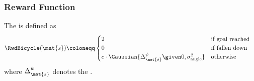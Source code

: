 \begin{frame}[label=solution_reward]
    \frametitle{Reward Function}

    \begin{definition}
        The  is defined as
        \begin{align}
            \RwdBicycle(\mat{s}) &\coloneqq \begin{cases}
                    2 & \text{if goal reached} \\
                    0 & \text{if fallen down} \\
                    c\cdot\Gaussian{\Delta^\psi_{\mat{s}} \given 0, \sigma_{\text{angle}}^2} & \text{otherwise}
                \end{cases}
        \end{align}
    where $\Delta^\psi_{\mat{s}}$ denotes the .
    \end{definition}
    \vspace{2ex}
    \centering
    
\end{frame}


